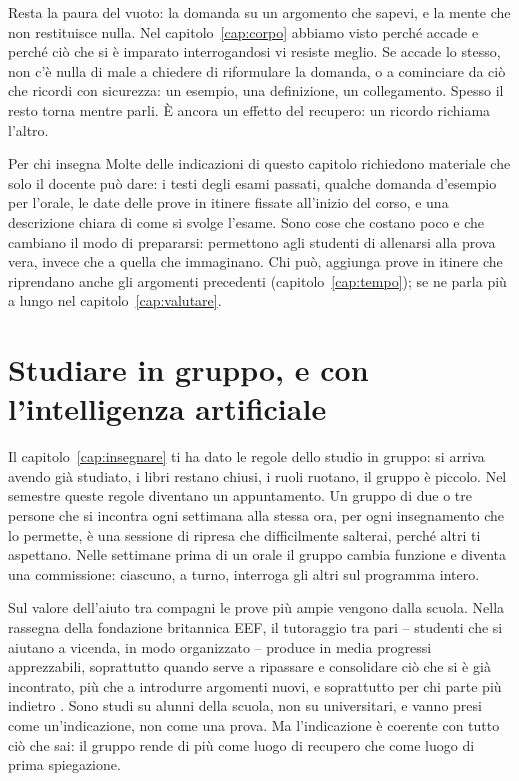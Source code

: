 Resta la paura del vuoto: la domanda su un argomento che sapevi, e la
mente che non restituisce nulla. Nel capitolo~\ref{cap:corpo} abbiamo
visto perché accade e perché ciò che si è imparato interrogandosi vi
resiste meglio. Se accade lo stesso, non c'è nulla di male a chiedere
di riformulare la domanda, o a cominciare da ciò che ricordi con
sicurezza: un esempio, una definizione, un collegamento. Spesso il
resto torna mentre parli. È ancora un effetto del recupero: un ricordo
richiama l'altro.

\begin{riquadro}{Per chi insegna}
Molte delle indicazioni di questo capitolo richiedono materiale che
solo il docente può dare: i testi degli esami passati, qualche domanda
d'esempio per l'orale, le date delle prove in itinere fissate
all'inizio del corso, e una descrizione chiara di come si svolge
l'esame. Sono cose che costano poco e che cambiano il modo di
prepararsi: permettono agli studenti di allenarsi alla prova vera,
invece che a quella che immaginano. Chi può, aggiunga prove in itinere
che riprendano anche gli argomenti precedenti
(capitolo~\ref{cap:tempo}); se ne parla più a lungo nel
capitolo~\ref{cap:valutare}.
\end{riquadro}

\section{Studiare in gruppo, e con l'intelligenza artificiale}

Il capitolo~\ref{cap:insegnare} ti ha dato le regole dello studio in
gruppo: si arriva avendo già studiato, i libri restano chiusi, i ruoli
ruotano, il gruppo è piccolo. Nel semestre queste regole diventano un
appuntamento. Un gruppo di due o tre persone che si incontra ogni
settimana alla stessa ora, per ogni insegnamento che lo permette, è una
sessione di ripresa che difficilmente salterai, perché altri ti
aspettano. Nelle settimane prima di un orale il gruppo cambia funzione
e diventa una commissione: ciascuno, a turno, interroga gli altri sul
programma intero.

Sul valore dell'aiuto tra compagni le prove più ampie vengono dalla
scuola. Nella rassegna della fondazione britannica EEF, il tutoraggio
tra pari -- studenti che si aiutano a vicenda, in modo organizzato --
produce in media progressi apprezzabili, soprattutto quando serve a
ripassare e consolidare ciò che si è già incontrato, più che a
introdurre argomenti nuovi, e soprattutto per chi parte più indietro
\parencite{eef2025peer}. Sono studi su alunni della scuola, non su
universitari, e vanno presi come un'indicazione, non come una prova.
Ma l'indicazione è coerente con tutto ciò che sai: il gruppo rende di
più come luogo di recupero che come luogo di prima spiegazione.

